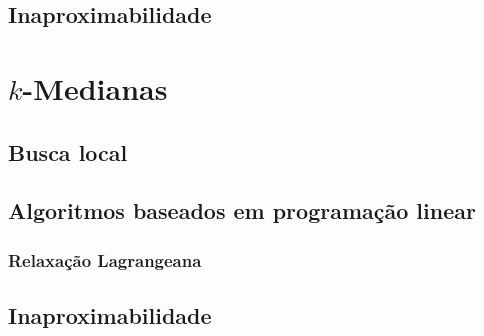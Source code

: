 \documentclass[12pt]{article}
\begin{document}
\subsection{Inaproximabilidade}
    
    
\section{$k$-Medianas}
    

\subsection{Busca local}
    
    
\subsection{Algoritmos baseados em programação linear}
    

\subsubsection{Relaxação Lagrangeana}
    

\subsection{Inaproximabilidade}
    

\newpage


\end{document}
